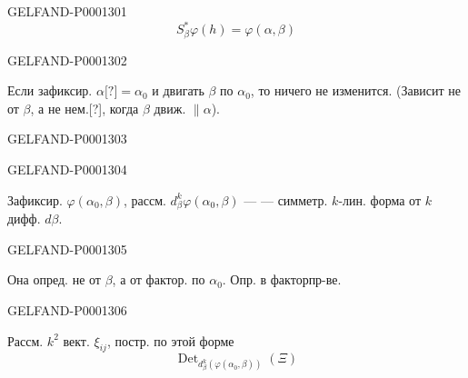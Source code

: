 \begin{GelfandAdjacentEvidence}{GELFAND-P000130}{1}
\begin{equation*}S_\beta^*\varphi(h)=\varphi(\alpha,\beta)\end{equation*}
\end{GelfandAdjacentEvidence}
\begin{GelfandAdjacentEvidence}{GELFAND-P000130}{2}

Если зафиксир. $\alpha\text{[?]}=\alpha_0$ и двигать $\beta$ по $\alpha_0$, то ничего не изменится.
(Зависит не от $\beta$, а не нем.[?], когда $\beta$ движ. $\parallel\alpha$).
\end{GelfandAdjacentEvidence}
\begin{GelfandAdjacentEvidence}{GELFAND-P000130}{3}

\end{GelfandAdjacentEvidence}
\begin{GelfandAdjacentEvidence}{GELFAND-P000130}{4}

Зафиксир. $\varphi(\alpha_0,\beta)$, рассм. $d_\beta^k\varphi(\alpha_0,\beta)$ ---
--- симметр. $k$-лин. форма от $k$ дифф. $d\beta$.
\end{GelfandAdjacentEvidence}
\begin{GelfandAdjacentEvidence}{GELFAND-P000130}{5}

Она опред. не от $\beta$, а от фактор. по $\alpha_0$. Опр. в факторпр-ве.
\end{GelfandAdjacentEvidence}
\begin{GelfandAdjacentEvidence}{GELFAND-P000130}{6}

Рассм. $k^2$ вект. $\xi_{ij}$, постр. по этой форме
\begin{equation*}\operatorname{Det}_{d_\beta^k(\varphi(\alpha_0,\beta))}(\Xi)\end{equation*}
\end{GelfandAdjacentEvidence}
